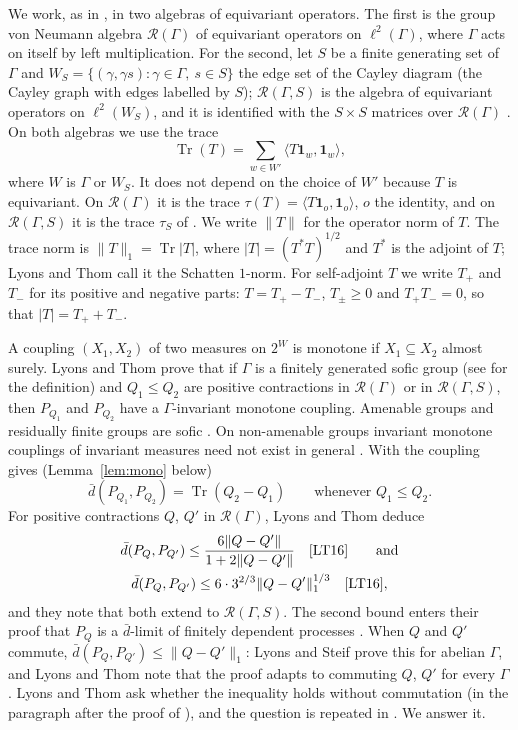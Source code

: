 \documentclass[11pt]{amsart}
\theoremstyle{remark}
\numberwithin{equation}{section}
\newcommand{\Tr}{\operatorname{Tr}}
\newcommand{\dbar}{\bar d}
\newcommand{\R}{\mathcal{R}}
\begin{document}
We work, as in \cite{LT16}, in two algebras of equivariant operators. The first is the group von Neumann algebra $\R(\Gamma)$ of equivariant operators on $\ell^2(\Gamma)$, where $\Gamma$ acts on itself by left multiplication. For the second, let $S$ be a finite generating set of $\Gamma$ and $W_S=\{(\gamma,\gamma s):\gamma\in\Gamma,\ s\in S\}$ the edge set of the Cayley diagram (the Cayley graph with edges labelled by $S$); $\R(\Gamma,S)$ is the algebra of equivariant operators on $\ell^2(W_S)$, and it is identified with the $S\times S$ matrices over $\R(\Gamma)$ \cite[Lemma~3.4]{LT16}. On both algebras we use the trace
\[
\Tr(T)=\sum_{w\in W'}\langle T\mathbf 1_w,\mathbf 1_w\rangle,
\]
where $W$ is $\Gamma$ or $W_S$. It does not depend on the choice of $W'$ because $T$ is equivariant. On $\R(\Gamma)$ it is the trace $\tau(T)=\langle T\mathbf 1_o,\mathbf 1_o\rangle$, $o$ the identity, and on $\R(\Gamma,S)$ it is the trace $\tau_S$ of \cite[Section~3]{LT16}. We write $\|T\|$ for the operator norm of $T$. The trace norm is $\|T\|_1=\Tr|T|$, where $|T|=(T^*T)^{1/2}$ and $T^*$ is the adjoint of $T$; Lyons and Thom call it the Schatten $1$-norm. For self-adjoint $T$ we write $T_+$ and $T_-$ for its positive and negative parts: $T=T_+-T_-$, $T_\pm\ge0$ and $T_+T_-=0$, so that $|T|=T_++T_-$.

A coupling $(X_1,X_2)$ of two measures on $2^W$ is monotone if $X_1\subseteq X_2$ almost surely. Lyons and Thom \cite[Theorem~5.1]{LT16} prove that if $\Gamma$ is a finitely generated sofic group (see \cite{Pe08} for the definition) and $Q_1\le Q_2$ are positive contractions in $\R(\Gamma)$ or in $\R(\Gamma,S)$, then $P_{Q_1}$ and $P_{Q_2}$ have a $\Gamma$-invariant monotone coupling. Amenable groups and residually finite groups are sofic \cite{Pe08}. On non-amenable groups invariant monotone couplings of invariant measures need not exist in general \cite{Me13}. With \cite[Lemma~7.2]{LT16} the coupling gives (Lemma~\ref{lem:mono} below)
\begin{equation}\label{eq:mono}
\dbar(P_{Q_1},P_{Q_2})=\Tr(Q_2-Q_1)\qquad\text{whenever } Q_1\le Q_2 .
\end{equation}
For positive contractions $Q$, $Q'$ in $\R(\Gamma)$, Lyons and Thom deduce
\begin{gather*}
\dbar(P_Q,P_{Q'})\le\frac{6\|Q-Q'\|}{1+2\|Q-Q'\|}\quad\text{\cite[Lemma~7.8]{LT16}}\qquad\text{and}\\
\dbar(P_Q,P_{Q'})\le 6\cdot3^{2/3}\|Q-Q'\|_1^{1/3}\quad\text{\cite[Lemma~7.9]{LT16}},
\end{gather*}
and they note that both extend to $\R(\Gamma,S)$. The second bound enters their proof that $P_Q$ is a $\dbar$-limit of finitely dependent processes \cite[Theorem~7.3]{LT16}. When $Q$ and $Q'$ commute, $\dbar(P_Q,P_{Q'})\le\|Q-Q'\|_1$: Lyons and Steif \cite{LS03} prove this for abelian $\Gamma$, and Lyons and Thom note that the proof adapts to commuting $Q$, $Q'$ for every $\Gamma$. Lyons and Thom ask whether the inequality holds without commutation (in the paragraph after the proof of \cite[Lemma~7.8]{LT16}), and the question is repeated in \cite[Section~5.2]{Ly14}. We answer it.
\end{document}
